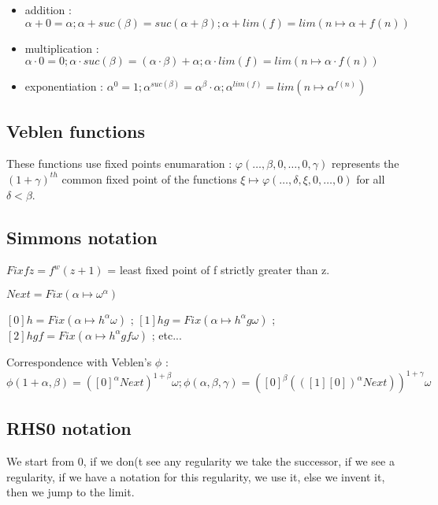 \documentclass[10pt]{article}
\begin{document}
\smallskip
\begin{itemize}
     \setlength{\itemsep}{1pt}
     \setlength{\parskip}{0pt}
     \setlength{\parsep}{0pt}
\item addition : \( \alpha+0=\alpha ; \alpha+suc(\beta)=suc(\alpha+\beta); \alpha+lim(f)=lim(n \mapsto \alpha+f(n)) \)

\item multiplication : \( \alpha \cdot 0 = 0 ; \alpha \cdot suc(\beta) = (\alpha \cdot \beta) + \alpha ; \alpha \cdot lim(f) = lim (n \mapsto \alpha \cdot f(n)) \)

\item exponentiation : \( \alpha^0 = 1 ; \alpha^{suc(\beta)} = \alpha^\beta \cdot \alpha ; \alpha^{lim(f)} = lim (n \mapsto \alpha^{f(n)}) \)
\end{itemize}


\subsection{Veblen functions}

These functions use fixed points enumaration : \(\varphi(\ldots,\beta,0,\ldots,0,\gamma) \) represents the \((1+\gamma)^{th}\) common fixed point of the functions \( \xi \mapsto \varphi(\ldots,\delta,\xi,0,\ldots,0)\) for all \(\delta < \beta\).


\subsection{Simmons notation}

\( Fix f z = f^w(z+1)\) = least fixed point of f strictly greater than z.

\( Next = Fix (\alpha \mapsto \omega^\alpha) \) 

\( [0] h = Fix (\alpha \mapsto h^\alpha \omega) \) ;
\( [1] h g = Fix (\alpha \mapsto h^\alpha g \omega) \) ;
\( [2] h g f = Fix (\alpha \mapsto h^\alpha g f \omega) \) ; etc...

Correspondence with Veblen's \(\phi\) : \( \phi(1+\alpha,\beta) = ([0]^\alpha Next)^{1+\beta} \omega ; 
 \phi(\alpha,\beta,\gamma) = ([0]^\beta (([1] [0])^\alpha Next))^{1+\gamma} \omega \)




\subsection{RHS0 notation}

We start from 0, if we don(t see any regularity we take the successor, if we see a regularity, if we have a notation for this regularity, we use it, else we invent it, then we jump to the limit.
\end{document}
